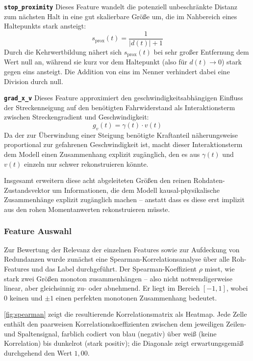 \medskip
\noindent\textbf{\texttt{stop\_proximity}} Dieses Feature wandelt die potenziell unbeschränkte Distanz zum nächsten Halt in eine gut skalierbare Größe um, die im Nahbereich eines Haltepunkts stark ansteigt:
\begin{equation}
    s_{\text{prox}}(t) = \frac{1}{|d(t)| + 1}
    \label{eq:stop_proximity}
\end{equation}
Durch die Kehrwertbildung nähert sich $s_{\text{prox}}(t)$ bei sehr großer Entfernung dem Wert null an, während sie kurz vor dem Haltepunkt (also für $d(t)\to 0$) stark gegen eins ansteigt. Die Addition von eins im Nenner verhindert dabei eine Division durch null.

\medskip
\noindent\textbf{\texttt{grad\_x\_v}} Dieses Feature approximiert den geschwindigkeitsabhängigen Einfluss der Streckenneigung auf den benötigten Fahrwiderstand als Interaktionsterm zwischen Streckengradient und Geschwindigkeit:
\begin{equation}
    g_v(t) = \gamma(t) \cdot v(t)
    \label{eq:grad_x_v}
\end{equation}
Da der zur Überwindung einer Steigung benötigte Kraftanteil näherungsweise proportional zur gefahrenen Geschwindigkeit ist, macht dieser Interaktionsterm dem Modell einen Zusammenhang explizit zugänglich, den es aus $\gamma(t)$ und $v(t)$ einzeln nur schwer rekonstruieren könnte.

\medskip
Insgesamt erweitern diese acht abgeleiteten Größen den reinen Rohdaten-Zustandsvektor um Informationen, die dem Modell kausal-physikalische Zusammenhänge explizit zugänglich machen -- anstatt dass es diese erst implizit aus den rohen Momentanwerten rekonstruieren müsste.

\subsubsection{Feature Auswahl}
\label{subsubsec:feature_auswahl}

Zur Bewertung der Relevanz der einzelnen Features sowie zur Aufdeckung von Redundanzen wurde zunächst eine Spearman-Korrelationsanalyse über alle Roh-Features und das Label durchgeführt. Der Spearman-Koeffizient $\rho$ misst, wie stark zwei Größen monoton zusammenhängen -- also nicht notwendigerweise linear, aber gleichsinnig zu- oder abnehmend. Er liegt im Bereich $[-1,1]$, wobei $0$ keinen und $\pm 1$ einen perfekten monotonen Zusammenhang bedeutet.

\autoref{fig:spearman} zeigt die resultierende Korrelationsmatrix als Heatmap. Jede Zelle enthält den paarweisen Korrelationskoeffizienten zwischen dem jeweiligen Zeilen- und Spaltensignal, farblich codiert von blau (negativ) über weiß (keine Korrelation) bis dunkelrot (stark positiv); die Diagonale zeigt erwartungsgemäß durchgehend den Wert $1{,}00$.

